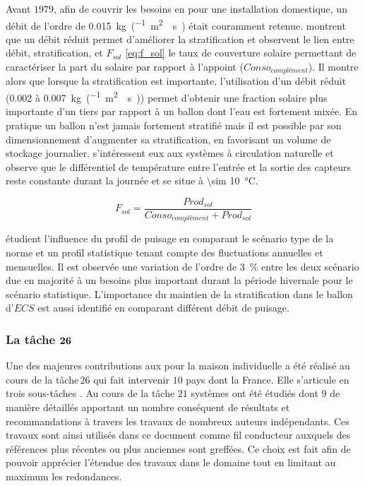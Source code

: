 Avant $1979$, afin de couvrir les besoins en  pour une installation domestique,
un débit de l’ordre de \SI{0.015}{kg\per(\metre\squared\period\second)}
était couramment retenue. \textcite{Koppen1979} montrent que un débit réduit
permet d’améliorer la stratification et \textcite{Wuestling1985}
observent le lien entre débit, stratification, et $F_{sol}$ \eqref{eq:f_sol} le taux de couverture
solaire permettant de caractériser la part du solaire par rapport à l’appoint ($Conso_{complément}$).
Il montre alors que lorsque la stratification est importante,
l’utilisation d’un débit réduit (\num{0.002} à \SI{0.007}{kg\per(\metre\squared\period\second)}) permet
d’obtenir une fraction solaire plus importante d’un tiers par rapport à un ballon dont
l’eau est fortement mixée. En pratique un ballon n’est jamais fortement stratifié mais il est possible par son dimensionnement
d’augmenter sa stratification, en favorisant un volume de stockage journalier. \textcite{Loef1967}
s’intéressent eux aux systèmes à circulation naturelle et observe que le différentiel
de température entre l’entrée et la sortie des capteurs reste constante durant la journée
et se situe à \SI{\sim 10}{\celsius}.

\begin{equation}\label{eq:f_sol}
    F_{sol} = \frac{Prod_{sol}}{Conso_{complément} + Prod_{sol}}
\end{equation}

\textcite{Jordan2001197} étudient l’influence du profil de puisage en comparant le
scénario type de la norme  et un profil statistique tenant compte
des fluctuations annuelles et mensuelles. Il est observée une variation de l’ordre
de \SI{3}{\percent} entre les deux scénario due en majorité à un besoins plus
important durant la période hivernale pour le scénario statistique.
L’importance du maintien de la stratification dans le ballon d’$ECS$ est aussi identifié
en comparant différent débit de puisage.


\subsubsection{La tâche $\bf{26}$} %
\label{ssub:la_tâche_26}
Une des majeures contributions aux  pour la maison individuelle a été réalisé au cours
de la tâche\,$26$ qui fait intervenir $10$ pays dont la France. Elle s’articule en
trois sous-tâches \parencite{Task26C2003}. Au cours
de la tâche $21$ systèmes ont été étudiés dont $9$ de manière détaillés apportant
un nombre conséquent de résultats et recommandations à travers les travaux de nombreux
auteurs indépendants.
Ces travaux sont ainsi utilisés dans ce document comme fil conducteur auxquels des
références plus récentes ou plus anciennes sont greffées. Ce choix est fait afin
de pouvoir apprécier l’étendue des travaux dans le domaine tout en limitant au
maximum les redondances.

